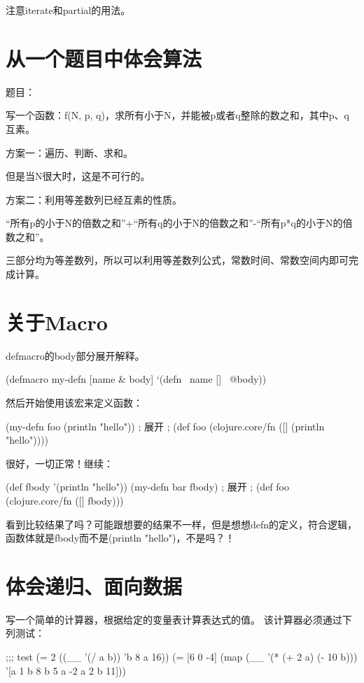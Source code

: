 ﻿\documentclass[a4paper,11pt]{article}
\begin{document}
  注意iterate和partial的用法。


  \section[从一个题目中体会算法]{从一个题目中体会算法}
  题目：\par
  写一个函数：f(N, p, q)，求所有小于N，并能被p或者q整除的数之和，其中p、q互素。

  方案一：遍历、判断、求和。\par
  但是当N很大时，这是不可行的。

  方案二：利用等差数列已经互素的性质。\par
  “所有p的小于N的倍数之和”+“所有q的小于N的倍数之和”-“所有p*q的小于N的倍数之和”。

  三部分均为等差数列，所以可以利用等差数列公式，常数时间、常数空间内即可完成计算。


  \section[关于Macro]{关于Macro}
  defmacro的body部分展开解释。
  
  \begin{schemecode}
    (defmacro my-defn
      [name & body]
      `(defn ~name [] ~@body))
  \end{schemecode}

  然后开始使用该宏来定义函数：

  \begin{schemecode}
    (my-defn foo (println "hello"))
    ; 展开
    ; (def foo (clojure.core/fn ([] (println "hello"))))
  \end{schemecode}

  很好，一切正常！继续：

  \begin{schemecode}
    (def fbody '(println "hello"))
    (my-defn bar fbody)
    ; 展开
    ; (def foo (clojure.core/fn ([] fbody)))
  \end{schemecode}

  看到比较结果了吗？可能跟想要的结果不一样，但是想想defn的定义，符合逻辑，
  函数体就是fbody而不是(println "hello")，不是吗？！


  \section[体会递归、面向数据]{体会递归、面向数据}
  写一个简单的计算器，根据给定的变量表计算表达式的值。
  该计算器必须通过下列测试：\par
  \begin{schemecode}
;;; test
(= 2 ((__ '(/ a b))
      '{b 8 a 16}))
(= [6 0 -4]
     (map (__ '(* (+ 2 a)
                     (- 10 b)))
          '[{a 1 b 8}
            {b 5 a -2}
            {a 2 b 11}]))
  \end{schemecode}
  
\end{document}
